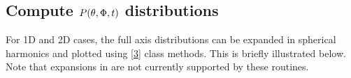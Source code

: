 \documentclass[letterpaper,table,10pt,english]{jupyterBook}
\begin{document}
\subsection{Compute \protect\(P(\theta,\Phi,t)\protect\) distributions}
\label{\detokenize{part1/theory_molecular_alignment_170723:compute-p-theta-phi-t-distributions}}
\sphinxAtStartPar
For 1D and 2D cases, the full axis distributions can be expanded in spherical harmonics and plotted using  {[}\hyperlink{cite.backmatter/bibliography:id668}{3}{]} class methods. This is briefly illustrated below. Note that expansions in {\hyperref[\detokenize{backmatter/glossary:term-Wigner-rotation-matrix-elements}]{}} are not currently supported by these routines.
\end{document}
